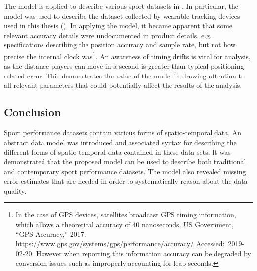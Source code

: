 The model is applied to describe various sport datasets in . In particular, the model was used to describe the dataset collected by wearable tracking devices used in this thesis (). In applying the model, it became apparent that some relevant accuracy details were undocumented in product details, e.g. specifications describing the position accuracy and sample rate, but not how precise the internal clock was\footnote{In the case of GPS devices, satellites broadcast GPS timing information, which allows a theoretical accuracy of 40 nanoseconds. US Government, ``GPS Accuracy,'' 2017. \url{https://www.gps.gov/systems/gps/performance/accuracy/} Accessed:~2019-02-20. However when reporting this information accuracy can be degraded by conversion issues such as improperly accounting for leap seconds.}. An awareness of timing drifts is vital for analysis, as the distance players can move in a second is greater than typical positioning related error. This demonstrates the value of the model in drawing attention to all relevant parameters that could potentially affect the results of the analysis.

\subsection{Conclusion}\label{conclusion-dataclass}

Sport performance datasets contain various forms of spatio-temporal
data. An abstract data model was introduced and associated syntax for describing
the different forms of spatio-temporal data contained in these data
sets. It was demonstrated that the proposed model can be used to describe both
traditional and contemporary sport performance datasets. The model also
revealed missing error estimates that are needed in order to
systematically reason about the data quality. %

